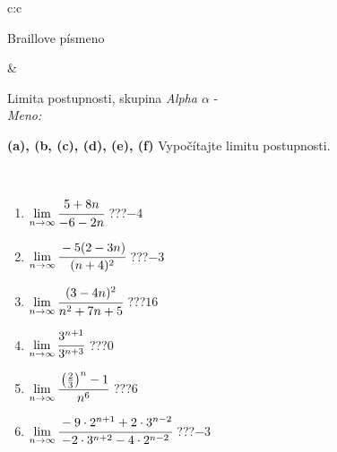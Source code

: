\documentclass[10pt]{report}
\begin{document}
\begin{tabular}{c:c}
\begin{minipage}[c][104.5mm][t]{0.5\linewidth}
\begin{center}
\begin{minipage}{0.20\linewidth}
\begin{center}
{\small Braillove písmeno}
\end{center}
\end{minipage}
\end{center}
\end{minipage}
&
\begin{minipage}[c][104.5mm][t]{0.5\linewidth}
\begin{center}
\vspace{5mm}
{\huge Limita postupnosti, skupina \textit{Alpha $\alpha$} -}\\[5mm]
\textit{Meno:}\phantom{xxxxxxxxxxxxxxxxxxxxxxxxxxxxxxxxxxxxxxxxxxxxxxxxxxxxxxxxxxxxxxxxx}\\[5mm]
\begin{minipage}{0.95\linewidth}
\begin{center}
{
\textbf{(a), (b, (c), (d), (e), (f)} Vypočítajte limitu postupnosti. \\[-1mm]
\phantom{x}
}
\end{center}
\end{minipage}
\\[1mm]
\begin{minipage}{0.79\linewidth}
\begin{center}
\begin{varwidth}{\linewidth}
\setlength{\itemsep}{0pt}
\begin{enumerate}
\normalsize
\item $\lim\limits_{n\to\infty}\cfrac{5+8n}{-6-2n}$\quad \dotfill\; ???\;\dotfill \quad $-4$
\item $\lim\limits_{n\to\infty}\cfrac{-5(2-3n)}{(n+4)^2}$\quad \dotfill\; ???\;\dotfill \quad $-3$
\item $\lim\limits_{n\to\infty}\cfrac{(3-4n)^2}{n^2+7n+5}$\quad \dotfill\; ???\;\dotfill \quad $16$
\item $\lim\limits_{n\to\infty}\cfrac{3^{n+1}}{3^{n+3}}$\quad \dotfill\; ???\;\dotfill \quad $0$
\item $\lim\limits_{n\to\infty}\cfrac{\left(\frac{2}{3}\right)^n -1}{n^{6}}$\quad \dotfill\; ???\;\dotfill \quad $6$
\item $\lim\limits_{n\to\infty}\cfrac{-9\cdot 2^{n+1}+2\cdot 3^{n-2}}{-2\cdot 3^{n+2}-4\cdot 2^{n-2}}$\quad \dotfill\; ???\;\dotfill \quad $-3$
\end{enumerate}
\end{varwidth}
\end{center}
\end{minipage}
\begin{minipage}{0.20\linewidth}
\begin{center}

\end{center}
\end{minipage}
\end{center}
\end{minipage}
\end{tabular}
\end{document}
